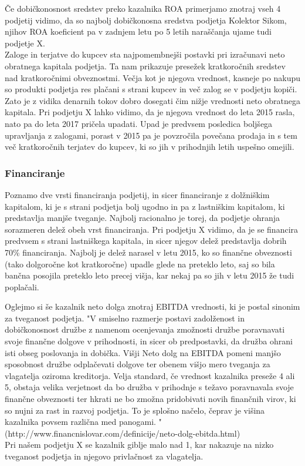 \documentclass[12pt,a4paper]{amsart}
\theoremstyle{definition} %
\theoremstyle{plain} %
\begin{document}
Če dobičkonosnost sredstev preko kazalnika ROA primerjamo znotraj vseh 4 podjetij vidimo, da so najbolj dobičkonosna sredstva podjetja Kolektor Sikom, njihov ROA koeficient pa v zadnjem letu po 5 letih naraščanja ujame tudi podjetje X.\\

Zaloge in terjatve do kupcev sta najpomembnejši postavki pri izračunavi neto obratnega kapitala podjetja. Ta nam prikazuje presežek kratkoročnih sredstev nad kratkoročnimi obveznostmi. Večja kot je njegova vrednost, kasneje po nakupu so produkti podjetja res plačani s strani kupcev in več zalog se v podjetju kopiči. Zato je z vidika denarnih tokov dobro dosegati čim nižje vrednosti neto obratnega kapitala. Pri podjetju X lahko vidimo, da je njegova vrednost do leta 2015 rasla, nato pa do leta 2017 pričela upadati. Upad je predvsem posledica boljšega upravljanja z zalogami, porast v 2015 pa je povzročila povečana prodaja in s tem več kratkoročnih terjatev do kupcev, ki so jih v prihodnjih letih uspešno omejili.\\



\subsubsection{Financiranje}
Poznamo dve vrsti financiranja podjetij, in sicer financiranje z dolžniškim kapitalom, ki je s strani podjetja bolj ugodno in pa z lastniškim kapitalom, ki predstavlja manjše tveganje. Najbolj racionalno je torej, da podjetje ohranja sorazmeren delež obeh vrst financiranja. Pri podjetju X vidimo, da je se financira predvsem s strani lastniškega kapitala, in sicer njegov delež predstavlja dobrih 70\% financiranja. Najbolj je delež narasel v letu 2015, ko so finančne obveznosti (tako dolgoročne kot kratkoročne) upadle glede na preteklo leto, saj so bila bančna posojila preteklo leto precej višja, kar nekaj pa so jih v letu 2015 že tudi poplačali.

Oglejmo si še kazalnik neto dolga znotraj EBITDA vrednosti, ki je postal sinonim za tveganost podjetja. "V smiselno razmerje postavi zadolženost in dobičkonosnost družbe z namenom ocenjevanja zmožnosti družbe poravnavati svoje finančne dolgove v prihodnosti, in sicer ob predpostavki, da družba ohrani isti obseg poslovanja in dobička. Višji Neto dolg na EBITDA pomeni manjšo sposobnost družbe odplačevati dolgove ter obenem višjo mero tveganja za vlagatelja oziroma kreditorja.
Velja standard, če vrednost kazalnika preseže 4 ali 5, obstaja velika verjetnost da bo družba v prihodnje s težavo poravnavala svoje finančne obveznosti ter hkrati ne bo zmožna pridobivati novih finančnih virov, ki so nujni za rast in razvoj podjetja. To je splošno načelo, čeprav je višina kazalnika povsem različna med panogami. "\\ 
(http://www.financnislovar.com/definicije/neto-dolg-ebitda.html)\\
Pri našem podjetju X se kazalnik giblje malo nad 1, kar nakazuje na nizko tveganost podjetja in njegovo privlačnost za vlagatelja.
\end{document}

